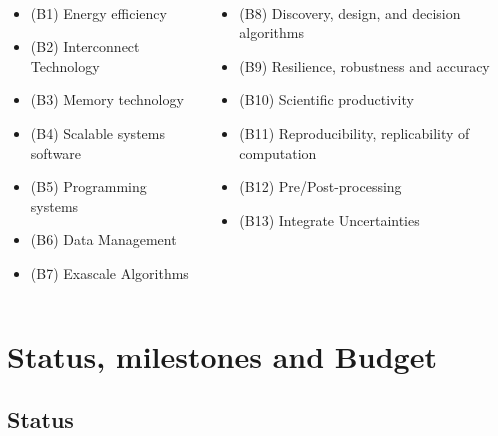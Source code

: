 \begin{frame}[fragile=singleslide]{\insertsectionhead}
  \framesubtitle{\insertsubsectionhead}
  \scriptsize
  \begin{columns}[]
    \begin{column}{.5\linewidth}
      \begin{itemize}
        \item (B1) Energy efficiency
        \item (B2) Interconnect Technology
        \item (B3) Memory technology
        \item (B4) Scalable systems software
        \item (B5) Programming systems
        \item (B6) Data Management
        \item (B7) Exascale Algorithms
      \end{itemize}
    \end{column}
    \begin{column}{.5\linewidth}
      \begin{itemize}
        \item (B8) Discovery, design, and decision algorithms
        \item (B9) Resilience, robustness and accuracy
        \item (B10) Scientific productivity
        \item (B11) Reproducibility, replicability of computation
        \item (B12) Pre/Post-processing
        \item (B13) Integrate Uncertainties
      \end{itemize}
    \end{column}
  \end{columns}

  
\end{frame}
\section{Status, milestones and Budget}

\subsection{Status}

